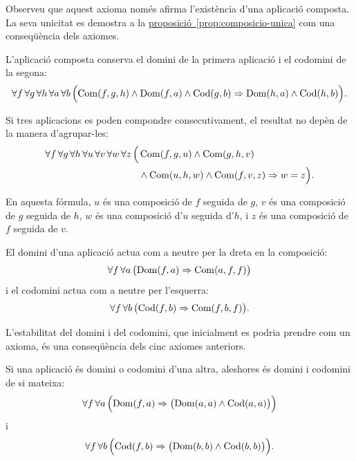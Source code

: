 Observeu que aquest axioma només afirma l'existència d'una aplicació composta. La seva unicitat es demostra a la \hyperref[prop:composicio-unica]{proposició~\ref*{prop:composicio-unica}} com una conseqüència dels axiomes.

\begin{axioma}\label{ax:composicio-dom-cod}
L'aplicació composta conserva el domini de la primera aplicació i el codomini de la segona:
\[
\forall f\,\forall g\,\forall h\,\forall a\,\forall b\,
\Bigl(
  \operatorname{Com}(f,g,h)\land\operatorname{Dom}(f,a)\land\operatorname{Cod}(g,b)
  \Rightarrow
  \operatorname{Dom}(h,a)\land\operatorname{Cod}(h,b)
\Bigr).
\]
\end{axioma}

\begin{axioma}\label{ax:associativitat}
Si tres aplicacions es poden compondre consecutivament, el resultat no depèn de la manera d'agrupar-les:
\[
\begin{aligned}
\forall f\,\forall g\,\forall h\,\forall u\,\forall v\,\forall w\,\forall z\,
\Bigl(&\operatorname{Com}(f,g,u)\land\operatorname{Com}(g,h,v)\\
      &\land\operatorname{Com}(u,h,w)\land\operatorname{Com}(f,v,z)
      \Rightarrow w=z\Bigr).
\end{aligned}
\]
\end{axioma}

En aquesta fórmula, \(u\) és una composició de \(f\) seguida de \(g\), \(v\) és una composició de \(g\) seguida de \(h\), \(w\) és una composició d'\(u\) seguida d'\(h\), i \(z\) és una composició de \(f\) seguida de \(v\).

\begin{axioma}\label{ax:neutralitat}
El domini d'una aplicació actua com a neutre per la dreta en la composició:
\[
\forall f\,\forall a\,
\bigl(\operatorname{Dom}(f,a)\Rightarrow\operatorname{Com}(a,f,f)\bigr)
\]
i el codomini actua com a neutre per l'esquerra:
\[
\forall f\,\forall b\,
\bigl(\operatorname{Cod}(f,b)\Rightarrow\operatorname{Com}(f,b,f)\bigr).
\]
\end{axioma}

L'estabilitat del domini i del codomini, que inicialment es podria prendre com un axioma, és una conseqüència dels cinc axiomes anteriors.

\begin{proposicio}\label{prop:estabilitat}
Si una aplicació és domini o codomini d'una altra, aleshores és domini i codomini de si mateixa:
\[
\forall f \, \forall a \, \Bigl(\operatorname{Dom}(f,a)\Rightarrow\bigl(\operatorname{Dom}(a,a)\land\operatorname{Cod}(a,a)\bigr)\Bigr)
\]
i
\[
\forall f \, \forall b \, \Bigl(\operatorname{Cod}(f,b)\Rightarrow\bigl(\operatorname{Dom}(b,b)\land\operatorname{Cod}(b,b)\bigr)\Bigr).
\]
\end{proposicio}

